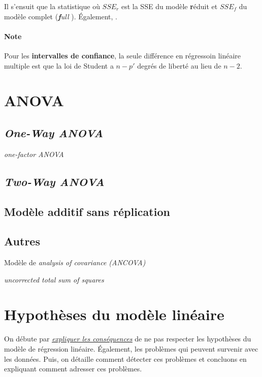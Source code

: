 \documentclass[french]{article}
\begin{document}
\begin{multicols*}{2}
\begin{definitionNOHFILL}
\begin{center}
\begin{tikzpicture}[x=0.75pt,y=0.75pt,yscale=-1,xscale=1]
\end{tikzpicture}
\end{center}

\bigskip

Il s'ensuit que la statistique  où $SSE_{r}$ est la SSE du modèle \textbf{r}éduit et $SSE_{f}$ du modèle complet (\og \textit{\textbf{f}ull} \fg{}). Également, .
\end{definitionNOHFILL}


\paragraph{Note}	Pour les \textbf{intervalles de confiance}, la seule différence en régressoin linéaire multiple est que la loi de Student a $n - p'$ degrés de liberté au lieu de $n - 2$. 




\newpage
\section{ANOVA}\label{sec:ANOVA}
\subsection{\og \textit{One-Way ANOVA} \fg{}}
\og \textit{one-factor ANOVA} \fg{}


\subsection{\og \textit{Two-Way ANOVA} \fg{}}


\subsection{Modèle additif sans réplication}


\subsection{Autres}
Modèle de \og \textit{analysis of covariance (ANCOVA)} \fg{}

\og \textit{uncorrected total sum of squares} \fg{}




\newpage
\section{Hypothèses du modèle linéaire}\label{sec:hypothesisLM}
\begin{rappel_enhanced}[Contexte]
On débute par \textit{\color{bleudefrance}\underline{\hyperref[subsec:LMHProbIssues]{\color{bleudefrance} expliquer les conséquences}}} de ne pas respecter les hypothèses du modèle de régression linéaire. Également, les problèmes qui peuvent survenir avec les données. Puis, on détaille comment détecter ces problèmes et concluons en expliquant comment adresser ces problèmes. 
\end{rappel_enhanced}


\end{multicols*}
\end{document}
